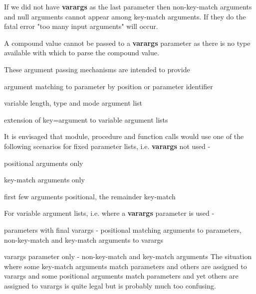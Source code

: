                 If we did not have {\bf varargs} as the last parameter then
                non-key-match arguments and null arguments cannot appear
                among key-match arguments. If they do the fatal error
                "too many input arguments" will occur.
                
                A compound value cannot be passed to a {\bf varargs}
                parameter as there is no type available with which to
                parse the compound value.
                
                These argument passing mechanisms are intended to provide
                \blist
                \item   argument matching to parameter by position
                        or parameter identifier
                \item   variable length, type and mode argument list
                \item   extension of key=argument to variable argument lists
                \blend
                            
                It is envisaged that module, procedure and function calls
                would use one of the following scenarios for fixed parameter
                lists, i.e. {\bf varargs} not used -
                \blist
                \item   positional arguments only
                \item   key-match arguments only
                \item   first few arguments positional, the remainder key-match
                \blend

                For variable argument lists, i.e. where a {\bf varargs} parameter
                is used -
                \blist
                \item   parameters with final varargs - positional matching
                        arguments to parameters, non-key-match and key-match
                        arguments to varargs
                \item   varargs parameter only - non-key-match and key-match
                        arguments
                \blend
                The situation where some key-match arguments match parameters
                and others are assigned to varargs and some positional
                arguments match parameters and yet others are assigned to
                varargs is quite legal but is probably much too confusing.
                
